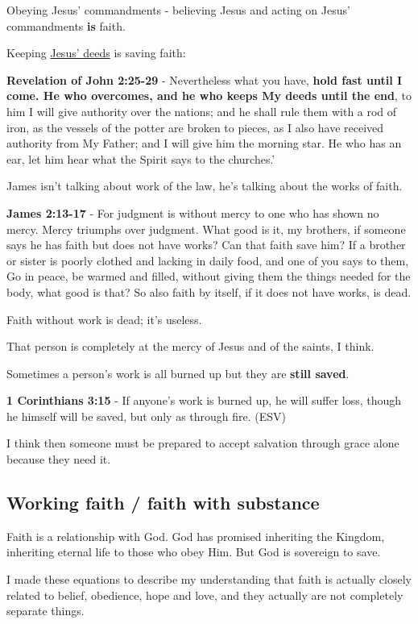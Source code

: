\documentclass[11pt]{article}
\begin{document}
Obeying Jesus' commandments - believing Jesus and acting on Jesus' commandments \textbf{is} faith.

Keeping \uline{Jesus' deeds} is saving faith:

\textbf{Revelation of John 2:25-29} - Nevertheless what you have, \textbf{hold fast until I come. He who overcomes, and he who keeps My deeds until the end}, to him I will give authority over the nations; and he shall rule them with a rod of iron, as the vessels of the potter are broken to pieces, as I also have received authority from My Father; and I will give him the morning star. He who has an ear, let him hear what the Spirit says to the churches.’

James isn't talking about work of the law, he's talking about the works of faith.

\textbf{James 2:13-17} - For judgment is without mercy to one who has shown no mercy. Mercy triumphs over judgment. What good is it, my brothers, if someone says he has faith but does not have works? Can that faith save him? If a brother or sister is poorly clothed and lacking in daily food, and one of you says to them, Go in peace, be warmed and filled, without giving them the things needed for the body, what good is that? So also faith by itself, if it does not have works, is dead.

Faith without work is dead; it's useless.

That person is completely at the mercy of Jesus and of the saints, I think.

Sometimes a person's work is all burned up but they are \textbf{still saved}.

\textbf{1 Corinthians 3:15} - If anyone's work is burned up, he will suffer loss, though he himself will be saved, but only as through fire. (ESV)

I think then someone must be prepared to accept salvation through grace alone because they need it.

\subsection{Working faith / faith with substance}
\label{sec:org6931045}

Faith is a relationship with God. God has promised inheriting the Kingdom, inheriting eternal life to those who obey Him. But God is sovereign to save.

I made these equations to describe my understanding that faith is actually closely related to belief, obedience, hope and love, and they actually are not completely separate things.
\end{document}
